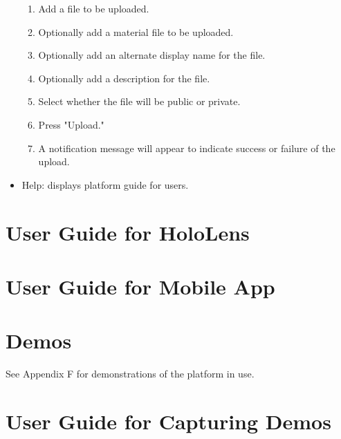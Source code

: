 \begin{itemize}
    \begin{enumerate}
        \item Add a file to be uploaded.  
        \item Optionally add a material file to be uploaded. 
        \item Optionally add an alternate display name for the file.
        \item Optionally add a description for the file.
        \item Select whether the file will be public or private.
        \item Press "Upload."
        \item A notification message will appear to indicate success or failure of the upload. 
    \end{enumerate}
    \item Help: displays platform guide for users. 
\end{itemize}

\section{User Guide for HoloLens}

\section{User Guide for Mobile App}

\section{Demos}

See Appendix F for demonstrations of the platform in use. 

\section{User Guide for Capturing Demos}

